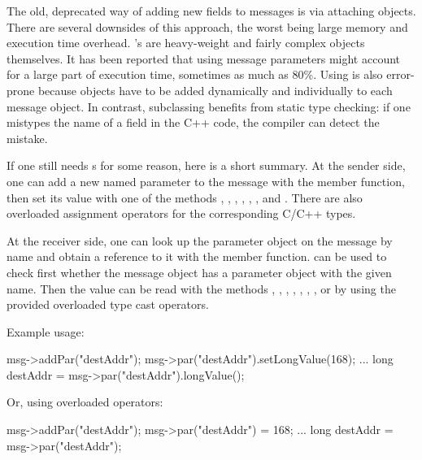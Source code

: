 The old, deprecated way of adding new fields to messages is via
attaching  objects.
There are several downsides of this approach, the worst being
large memory and execution time overhead. 's are
heavy-weight and fairly complex objects themselves.
It has been reported that using  message parameters
might account for a large part of execution time, sometimes as much as 80\%.
Using  is also error-prone because  objects
have to be added dynamically and individually to each message object.
In contrast, subclassing benefits from static type checking:
if one mistypes the name of a field in the C++ code, the compiler
can detect the mistake.

If one still needs s for some reason, here is a short summary.
At the sender side, one can add a new named parameter to the message
with the  member function, then set its value with
one of the methods , ,
, , ,
, and . There are also overloaded
assignment operators for the corresponding C/C++ types.

At the receiver side, one can look up the parameter object on the message
by name and obtain a reference to it with the  member function.
 can be used to check first whether the message object has a parameter
object with the given name. Then the value can be read with the methods
, , ,
, , ,
, or by using the provided overloaded type cast operators.

Example usage:

\begin{cpp}
msg->addPar("destAddr");
msg->par("destAddr").setLongValue(168);
...
long destAddr = msg->par("destAddr").longValue();
\end{cpp}

Or, using overloaded operators:

\begin{cpp}
msg->addPar("destAddr");
msg->par("destAddr") = 168;
...
long destAddr = msg->par("destAddr");
\end{cpp}

